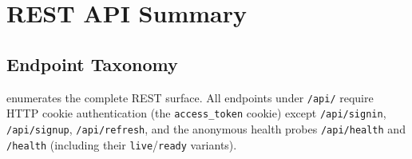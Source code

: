 \documentclass[12pt,a4paper]{article}
\theoremstyle{definition}
\theoremstyle{plain}
\theoremstyle{remark}
\begin{document}
\section{REST API Summary}
\label{sec:api}

\subsection{Endpoint Taxonomy}

 enumerates the complete REST surface. All
endpoints under \texttt{/api/} require HTTP cookie authentication (the
\texttt{access\_token} cookie) except \texttt{/api/signin},
\texttt{/api/signup}, \texttt{/api/refresh}, and the anonymous health
probes \texttt{/api/health} and \texttt{/health} (including their
\texttt{live}/\texttt{ready} variants).
\end{document}
